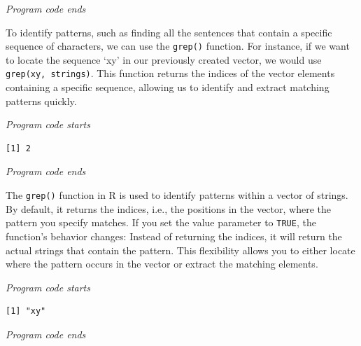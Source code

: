 \emph{Program code ends}

To identify patterns, such as finding all the sentences that contain a
specific sequence of characters, we can use the \texttt{grep()}
function. For instance, if we want to locate the sequence `xy' in our
previously created vector, we would use
\texttt{grep(\textquotesingle{}xy\textquotesingle{},\ strings)}. This
function returns the indices of the vector elements containing a
specific sequence, allowing us to identify and extract matching patterns
quickly.

\emph{Program code starts}

\begin{Shaded}
\begin{Highlighting}[]
\NormalTok{(}
\end{Highlighting}
\end{Shaded}

\begin{verbatim}
[1] 2
\end{verbatim}

\emph{Program code ends}

The \texttt{grep()} function in R is used to identify patterns within a
vector of strings. By default, it returns the indices, i.e., the
positions in the vector, where the pattern you specify matches. If you
set the value parameter to \texttt{TRUE}, the function's behavior
changes: Instead of returning the indices, it will return the actual
strings that contain the pattern. This flexibility allows you to
either locate where the pattern occurs in the vector or extract
the matching elements.

\emph{Program code starts}

\begin{Shaded}
\begin{Highlighting}[]
\NormalTok{(} \NormalTok{)}
\end{Highlighting}
\end{Shaded}

\begin{verbatim}
[1] "xy"
\end{verbatim}

\emph{Program code ends}

